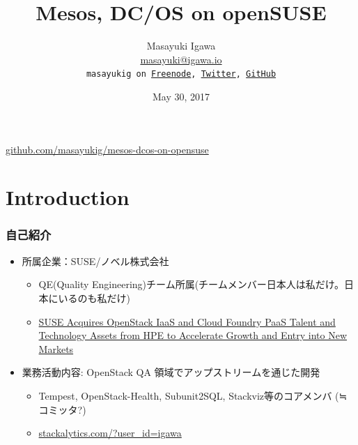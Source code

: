 \documentclass[aspectratio=169,11pt,hyperref={colorlinks=true}]{beamer}
\author[Masayuki Igawa]{%
  \texorpdfstring{%
    \centering
    Masayuki Igawa\\
    \href{mailto:masayuki@igawa.io}{masayuki@igawa.io}\\
    \texttt{masayukig on \href{http://freenode.net/}{Freenode},
     \href{https://twitter.com/masayukig}{Twitter},
     \href{https://github.com/masayukig}{GitHub}}
  }
  {Masayuki Igawa}
}
\date{May 30, 2017}
\title[Mesos, DC/OS on openSUSE
\hspace{2em}\insertframenumber/\inserttotalframenumber]{Mesos, DC/OS on openSUSE}
\begin{document}
{%
\begin{frame}[noframenumbering]
  \hypersetup{colorlinks,urlcolor=suse}
  \titlepage{}
  \centering
  \@place \par
  \href{https://github.com/masayukig/mesos-dcos-on-opensuse}{github.com/masayukig/mesos-dcos-on-opensuse}
\end{frame}
}


\section{Introduction}
\begin{frame}
  \frametitle{自己紹介}
  \begin{itemize}
    \item 所属企業：SUSE/ノベル株式会社
      \begin{itemize}
        \item QE(Quality Engineering)チーム所属(チームメンバー日本人は私だけ。日本にいるのも私だけ)
        \item \href{https://www.suse.com/newsroom/post/2016/suse-acquires-openstack-iaas-and-cloud-foundry-paas-talent-and-technology-assets-from-hpe-to-accelerate-growth-and-entry-into-new-markets/}{SUSE Acquires OpenStack IaaS and Cloud Foundry PaaS Talent and Technology Assets from HPE to Accelerate Growth and Entry into New Markets}
      \end{itemize}
    \item 業務活動内容: OpenStack QA 領域でアップストリームを通じた開発
      \begin{itemize}
        \item Tempest, OpenStack-Health, Subunit2SQL, Stackviz等のコアメンバ (≒ コミッタ?)
        \item \href{http://stackalytics.com/?user_id=igawa&release=all&metric=all}{stackalytics.com/?user\_id=igawa}
      \end{itemize}
  \end{itemize}
\end{frame}
\end{document}

